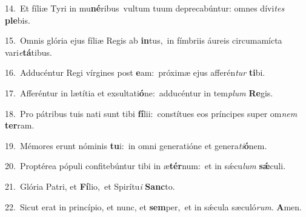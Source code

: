 {\numbfont\textcolor{\numbcolor}{14.}}~Et fíliæ Tyri in mu\-\textbf{né}\-ribus~\star vultum tuum deprecabúntur: omnes dívi\textit{tes} \textbf{ple}\-bis.\par
{\numbfont\textcolor{\numbcolor}{15.}}~Omnis glória ejus fíliæ Regis ab \textbf{in}\-tus,~\star in fímbriis áureis circumamícta vari\-\textit{e}\-\textbf{tá}tibus.\par
{\numbfont\textcolor{\numbcolor}{16.}}~Adducéntur Regi vírgines post \textbf{e}\-am:~\star próximæ ejus afferén\textit{tur} \textbf{ti}\-bi.\par
{\numbfont\textcolor{\numbcolor}{17.}}~Afferéntur in lætítia et exsultati\-\textbf{ó}\-ne:~\star adducéntur in tem\textit{plum} \textbf{Re}\-gis.\par
{\numbfont\textcolor{\numbcolor}{18.}}~Pro pátribus tuis nati sunt tibi \textbf{fí}\-lii:~\star constítues eos príncipes super om\textit{nem} \textbf{ter}\-ram.\par
{\numbfont\textcolor{\numbcolor}{19.}}~Mémores erunt nóminis \textbf{tu}\-i:~\star in omni generatióne et genera\-\textit{ti}\-\textbf{ó}nem.\par
{\numbfont\textcolor{\numbcolor}{20.}}~Proptérea pópuli confitebúntur tibi in æ\-\textbf{tér}\-num:~\star et in sǽcu\textit{lum} \textbf{sǽ}\-culi.\par
{\numbfont\textcolor{\numbcolor}{21.}}~Glória Patri, et \textbf{Fí}\-lio,~\star et Spirítu\textit{i} \textbf{Sanc}\-to.\par
{\numbfont\textcolor{\numbcolor}{22.}}~Sicut erat in princípio, et nunc, et \textbf{sem}\-per,~\star et in sǽcula sæculó\-\textit{rum}\-. \textbf{A}\-men.\par
